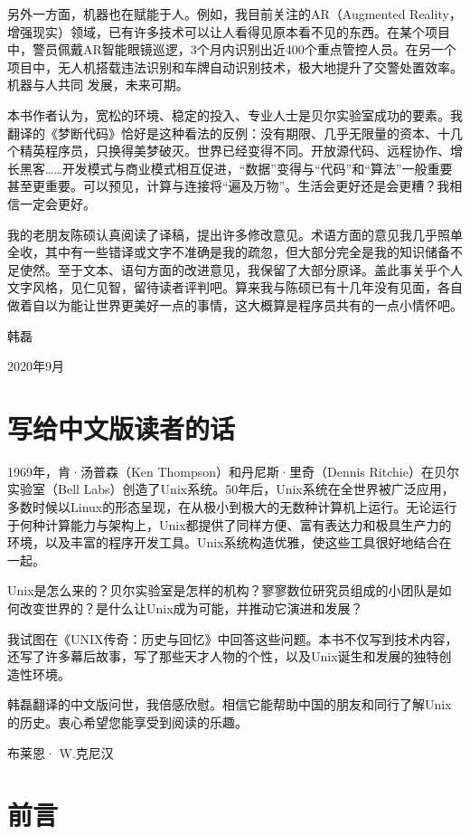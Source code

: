 \documentclass[a4paper,12pt,UTF8,twoside]{ctexbook}
\begin{document}
另外一方面，机器也在赋能于人。例如，我目前关注的AR（Augmented Reality，增强现实）领域，已有许多技术可以让人看得见原本看不见的东西。在某个项目中，警员佩戴AR智能眼镜巡逻，3个月内识别出近400个重点管控人员。在另一个项目中，无人机搭载违法识别和车牌自动识别技术，极大地提升了交警处置效率。机器与人共同 发展，未来可期。

本书作者认为，宽松的环境、稳定的投入、专业人士是贝尔实验室成功的要素。我翻译的《梦断代码》恰好是这种看法的反例：没有期限、几乎无限量的资本、十几个精英程序员，只换得美梦破灭。世界已经变得不同。开放源代码、远程协作、增长黑客……开发模式与商业模式相互促进，“数据”变得与“代码”和“算法”一般重要甚至更重要。可以预见，计算与连接将“遍及万物”。生活会更好还是会更糟？我相信一定会更好。

我的老朋友陈硕认真阅读了译稿，提出许多修改意见。术语方面的意见我几乎照单全收，其中有一些错译或文字不准确是我的疏忽，但大部分完全是我的知识储备不足使然。至于文本、语句方面的改进意见，我保留了大部分原译。盖此事关乎个人文字风格，见仁见智，留待读者评判吧。算来我与陈硕已有十几年没有见面，各自做着自以为能让世界更美好一点的事情，这大概算是程序员共有的一点小情怀吧。

韩磊

2020年9月





\chapter{写给中文版读者的话}

1969年，肯·汤普森（Ken Thompson）和丹尼斯·里奇（Dennis Ritchie）在贝尔实验室（Bell Labs）创造了Unix系统。50年后，Unix系统在全世界被广泛应用，多数时候以Linux的形态呈现，在从极小到极大的无数种计算机上运行。无论运行于何种计算能力与架构上，Unix都提供了同样方便、富有表达力和极具生产力的环境，以及丰富的程序开发工具。Unix系统构造优雅，使这些工具很好地结合在一起。

Unix是怎么来的？贝尔实验室是怎样的机构？寥寥数位研究员组成的小团队是如何改变世界的？是什么让Unix成为可能，并推动它演进和发展？

我试图在《UNIX传奇：历史与回忆》中回答这些问题。本书不仅写到技术内容，还写了许多幕后故事，写了那些天才人物的个性，以及Unix诞生和发展的独特创造性环境。

韩磊翻译的中文版问世，我倍感欣慰。相信它能帮助中国的朋友和同行了解Unix的历史。衷心希望您能享受到阅读的乐趣。

布莱恩· W.克尼汉

\chapter{前言}
\end{document}
